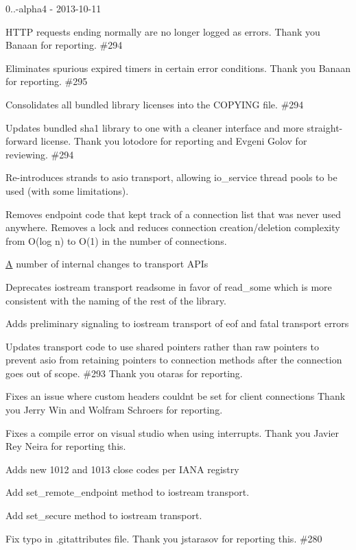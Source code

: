 0..-\/alpha4 -\/ 2013-\/10-\/11
\begin{DoxyItemize}
\item H\+T\+TP requests ending normally are no longer logged as errors. Thank you Banaan for reporting. \#294
\item Eliminates spurious expired timers in certain error conditions. Thank you Banaan for reporting. \#295
\item Consolidates all bundled library licenses into the C\+O\+P\+Y\+I\+NG file. \#294
\item Updates bundled sha1 library to one with a cleaner interface and more straight-\/forward license. Thank you lotodore for reporting and Evgeni Golov for reviewing. \#294
\item Re-\/introduces strands to asio transport, allowing {\ttfamily io\+\_\+service} thread pools to be used (with some limitations).
\item Removes endpoint code that kept track of a connection list that was never used anywhere. Removes a lock and reduces connection creation/deletion complexity from O(log n) to O(1) in the number of connections.
\item \mbox{\hyperlink{struct_a}{A}} number of internal changes to transport A\+P\+Is
\item Deprecates iostream transport {\ttfamily readsome} in favor of {\ttfamily read\+\_\+some} which is more consistent with the naming of the rest of the library.
\item Adds preliminary signaling to iostream transport of eof and fatal transport errors
\item Updates transport code to use shared pointers rather than raw pointers to prevent asio from retaining pointers to connection methods after the connection goes out of scope. \#293 Thank you otaras for reporting.
\item Fixes an issue where custom headers couldn\textquotesingle{}t be set for client connections Thank you Jerry Win and Wolfram Schroers for reporting.
\item Fixes a compile error on visual studio when using interrupts. Thank you Javier Rey Neira for reporting this.
\item Adds new 1012 and 1013 close codes per I\+A\+NA registry
\item Add {\ttfamily set\+\_\+remote\+\_\+endpoint} method to iostream transport.
\item Add {\ttfamily set\+\_\+secure} method to iostream transport.
\item Fix typo in .gitattributes file. Thank you jstarasov for reporting this. \#280

\end{DoxyItemize}
